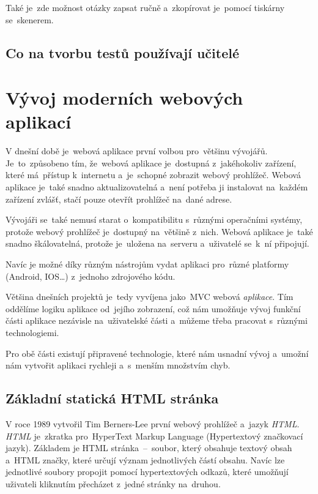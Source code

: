 \documentclass[10pt,a4paper]{article}
\begin{document}
        
        Také je~zde možnost otázky zapsat ručně a~zkopírovat je~pomocí tiskárny se~skenerem.

        \subsection{Co na tvorbu testů používají učitelé}

    \section{Vývoj moderních webových aplikací}
    V dnešní době je~webová aplikace první volbou pro~většinu vývojářů. Je~to~způsobeno tím, že~webová aplikace je~dostupná z~jakéhokoliv zařízení, které má~přístup k~internetu a~je~schopné zobrazit webový prohlížeč. Webová aplikace je~také snadno aktualizovatelná a~není potřeba ji instalovat na~každém zařízení zvlášť, stačí pouze otevřít prohlížeč na~dané adrese.
    
    Vývojáři se~také nemusí starat o~kompatibilitu s~různými operačními systémy, protože webový prohlížeč
    je~dostupný na~většině z~nich. Webová aplikace je~také snadno škálovatelná, protože je~uložena na~serveru a~uživatelé se~k~ní připojují.
    
    Navíc je možné díky různým nástrojům vydat aplikaci pro~různé platformy (Android, IOS\dots) z~jednoho zdrojového kódu.\cite{adobe:webapp}

    Většina dnešních projektů je~tedy vyvíjena jako~MVC webová \emph{aplikace}. Tím oddělíme logiku aplikace od~jejího zobrazení, což nám umožňuje vývoj funkční části aplikace nezávisle na~uživatelské části a~můžeme třeba pracovat s~různými technologiemi.
    
    Pro obě části existují připravené technologie, které nám usnadní vývoj a~umožní nám vytvořit aplikaci rychleji a~s~menším množstvím chyb.

    \cite{itnetworkBestPractices}

        \subsection{Základní statická HTML stránka}
        V roce 1989 vytvořil Tim Berners-Lee první webový prohlížeč a~jazyk \emph{HTML}. \emph{HTML} je~zkratka pro~HyperText Markup Language (Hypertextový značkovací jazyk). Základem je HTML stránka~--~soubor, který obsahuje textový obsah a~HTML značky, které určují význam jednotlivých částí obsahu. Navíc lze jednotlivé soubory propojit pomocí hypertextových odkazů, které umožňují uživateli kliknutím přecházet z~jedné stránky na~druhou.
\end{document}
